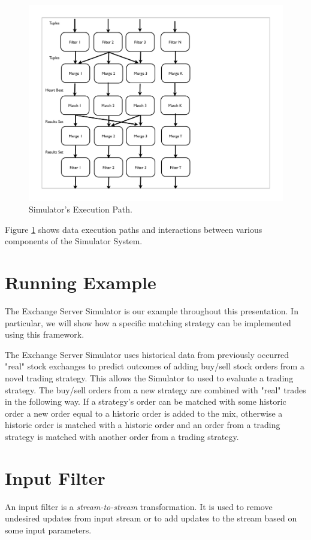 \documentclass{article}
\begin{document}
\begin{figure}
  \includegraphics[width=4.50in]{figures/ExchangeFigure.pdf}
  \caption{Simulator's Execution Path.}
  \label{fig:overview}
\end{figure}

Figure \ref{fig:overview} shows data execution paths and interactions between various components of the Simulator System.

\section{Running Example}

The Exchange Server Simulator is our example throughout this presentation. In particular, we will show how a specific matching strategy can be implemented using this framework.

The Exchange Server Simulator uses historical data from previously occurred "real" stock exchanges to predict outcomes of adding buy/sell stock orders from a novel trading strategy. This allows the Simulator to used to evaluate a trading strategy. The buy/sell orders from a new strategy are combined with "real" trades in the following way. If a strategy's order can be matched with some historic order a new order equal to a historic order is added to the mix, otherwise a historic order is matched with a historic order and an order from a trading strategy is matched with another order from a trading strategy.

\section{Input Filter}

An input filter is a \emph{stream-to-stream} transformation. It is used to remove undesired updates from input stream or to add updates to the stream based on some input parameters.
\end{document}
